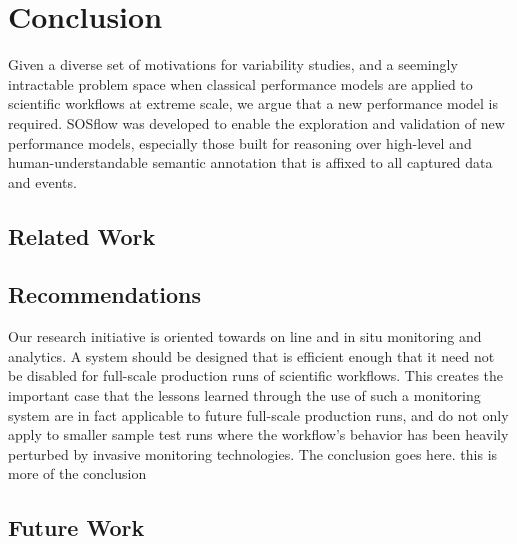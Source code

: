 
\section{Conclusion}
Given a diverse set of motivations for variability studies, and a
seemingly intractable problem space when classical performance models
are applied to scientific workflows at extreme scale, we argue that a
new performance model is required. SOSflow was developed to enable the
exploration and validation of new performance models, especially those
built for reasoning over high-level and human-understandable semantic
annotation that is affixed to all captured data and events.


\subsection{Related Work}


\subsection{Recommendations}
Our research initiative is oriented towards on line and in situ
monitoring and analytics. A system should be designed that is
efficient enough that it need not be disabled for full-scale
production runs of scientific workflows. This creates the important
case that the lessons learned through the use of such a monitoring
system are in fact applicable to future full-scale production runs,
and do not only apply to smaller sample test runs where the workflow's
behavior has been heavily perturbed by invasive monitoring
technologies.  The conclusion goes here. this is more of the
conclusion


\subsection{Future Work}

